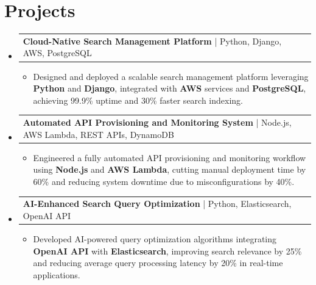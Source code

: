 \documentclass[letterpaper,10pt]{article}
\makeatletter
\newcommand{\resumeItem}[1]{
  \item{\fontsize{8pt}{9pt}\selectfont
    #1 \vspace{-3pt}
  }
}
\newcommand{\resumeProjectHeading}[2]{
    \item
    \begin{tabular*}{1.001\textwidth}{l@{\extracolsep{\fill}}r}
      \fontsize{8.5pt}{10pt}#1 & \textbf{\fontsize{8.5pt}{10pt} #2}\\
    \end{tabular*}\vspace{-7pt}
}
\newcommand{\resumeSubHeadingListStart}{\begin{itemize}[leftmargin=0pt, label={}]}
\newcommand{\resumeSubHeadingListEnd}{\end{itemize}}
\newcommand{\resumeItemListStart}{\begin{itemize}[leftmargin=*]}
\newcommand{\resumeItemListEnd}{\end{itemize}\vspace{-5pt}}
\makeatother
\begin{document}
\section{Projects}
    \vspace{-5pt}
    \resumeSubHeadingListStart
          \resumeProjectHeading
            {\textbf{Cloud-Native Search Management Platform} | Python, Django, AWS, PostgreSQL}{}
            \resumeItemListStart
                \resumeItem{Designed and deployed a scalable search management platform leveraging \textbf{Python} and \textbf{Django}, integrated with \textbf{AWS} services and \textbf{PostgreSQL}, achieving 99.9\% uptime and 30\% faster search indexing.}
            \resumeItemListEnd
        \vspace{-12pt}
    
        \resumeProjectHeading
            {\textbf{Automated API Provisioning and Monitoring System} | Node.js, AWS Lambda, REST APIs, DynamoDB}{}
        \resumeItemListStart
                \resumeItem{Engineered a fully automated API provisioning and monitoring workflow using \textbf{Node.js} and \textbf{AWS Lambda}, cutting manual deployment time by 60\% and reducing system downtime due to misconfigurations by 40\%.}
        \resumeItemListEnd
      \vspace{-12pt}
      \resumeProjectHeading
        {\textbf{AI-Enhanced Search Query Optimization} | Python, Elasticsearch, OpenAI API}{}
    \resumeItemListStart
            \resumeItem{Developed AI-powered query optimization algorithms integrating \textbf{OpenAI API} with \textbf{Elasticsearch}, improving search relevance by 25\% and reducing average query processing latency by 20\% in real-time applications.}
    \resumeItemListEnd
    \resumeSubHeadingListEnd
\end{document}
